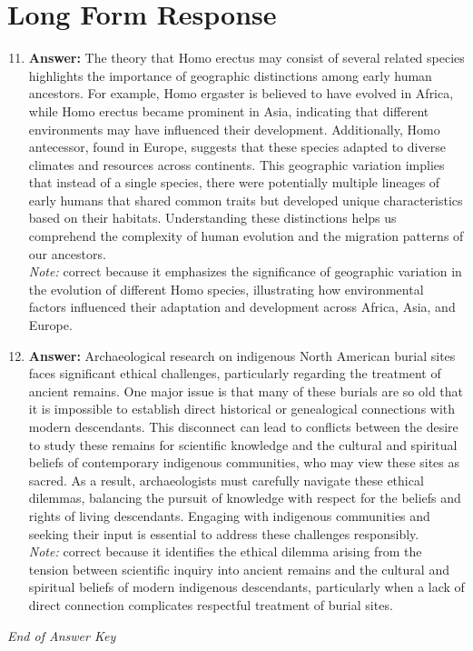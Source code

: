 \documentclass[12pt]{article}
\begin{document}
\section*{Long Form Response}
\begin{enumerate}[label=\arabic*.]
\setcounter{enumi}{10}
\item \textbf{Answer:} The theory that Homo erectus may consist of several related species highlights the importance of geographic distinctions among early human ancestors. For example, Homo ergaster is believed to have evolved in Africa, while Homo erectus became prominent in Asia, indicating that different environments may have influenced their development. Additionally, Homo antecessor, found in Europe, suggests that these species adapted to diverse climates and resources across continents. This geographic variation implies that instead of a single species, there were potentially multiple lineages of early humans that shared common traits but developed unique characteristics based on their habitats. Understanding these distinctions helps us comprehend the complexity of human evolution and the migration patterns of our ancestors.
\\ \textit{Note:} correct because it emphasizes the significance of geographic variation in the evolution of different Homo species, illustrating how environmental factors influenced their adaptation and development across Africa, Asia, and Europe.
\item \textbf{Answer:} Archaeological research on indigenous North American burial sites faces significant ethical challenges, particularly regarding the treatment of ancient remains. One major issue is that many of these burials are so old that it is impossible to establish direct historical or genealogical connections with modern descendants. This disconnect can lead to conflicts between the desire to study these remains for scientific knowledge and the cultural and spiritual beliefs of contemporary indigenous communities, who may view these sites as sacred. As a result, archaeologists must carefully navigate these ethical dilemmas, balancing the pursuit of knowledge with respect for the beliefs and rights of living descendants. Engaging with indigenous communities and seeking their input is essential to address these challenges responsibly.
\\ \textit{Note:} correct because it identifies the ethical dilemma arising from the tension between scientific inquiry into ancient remains and the cultural and spiritual beliefs of modern indigenous descendants, particularly when a lack of direct connection complicates respectful treatment of burial sites.
\end{enumerate}

\vfill
\noindent\textit{End of Answer Key}
\end{document}
